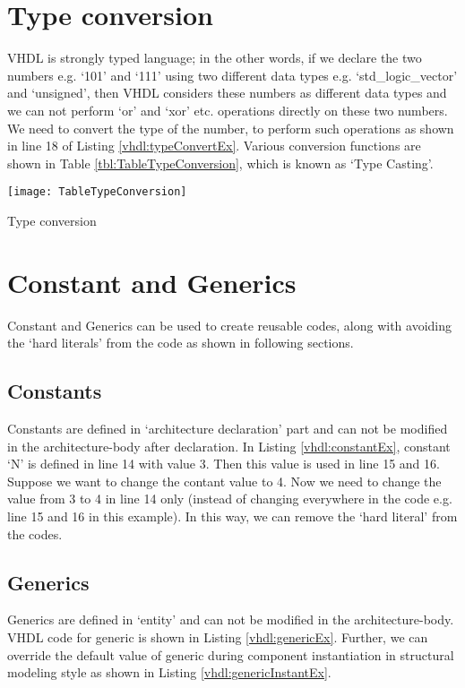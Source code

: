 \section{Type conversion}\label{sec:typeconversion}
VHDL is strongly typed language; in the other words, if we declare the two numbers e.g. `101' and `111' using two different data types e.g. `std\_logic\_vector' and `unsigned', then VHDL considers these numbers as different data types and we can not perform `or' and `xor' etc. operations directly on these two numbers. We need to convert the type of the number, to perform such operations as shown in line 18 of Listing \ref{vhdl:typeConvertEx}. Various conversion functions are shown in Table \ref{tbl:TableTypeConversion}, which is known as `Type Casting'.

\begin{table}
	\centering
	\texttt{[image: TableTypeConversion]}
	\caption{Type conversion}
	\label{tbl:TableTypeConversion}
\end{table}






\section{Constant and Generics}
Constant and Generics can be used to create reusable codes, along with avoiding the `hard literals' from the code as shown in following sections. 

\subsection{Constants}\label{sec:Constants}
Constants are defined in `architecture declaration' part and can not be modified in the architecture-body after declaration. In Listing \ref{vhdl:constantEx}, constant `N' is defined in line 14 with value 3. Then this value is used in line 15 and 16. Suppose we want to change the contant value to 4. Now we need to change the value from 3 to 4 in line 14 only (instead of changing everywhere in the code e.g. line 15 and 16 in this example). In this way, we can remove the `hard literal' from the codes.  



\subsection{Generics}\label{subsec:Generic}
Generics are defined in `entity' and can not be modified in the architecture-body. VHDL code for generic is shown in Listing \ref{vhdl:genericEx}. Further, we can override the default value of generic during component instantiation in structural modeling style as shown in Listing \ref{vhdl:genericInstantEx}. 


